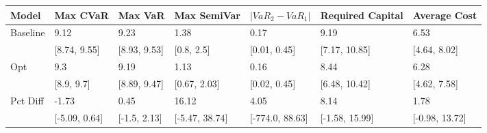 \begin{tabular}{lllllll}
\toprule
   Model &      Max CVaR &      Max VaR &    Max SemiVar & $|VaR_2 - VaR_1|$ & Required Capital &   Average Cost \\
\midrule
Baseline &          9.12 &         9.23 &           1.38 &              0.17 &             9.19 &           6.53 \\
         &  [8.74, 9.55] & [8.93, 9.53] &     [0.8, 2.5] &      [0.01, 0.45] &    [7.17, 10.85] &   [4.64, 8.02] \\
     Opt &           9.3 &         9.19 &           1.13 &              0.16 &             8.44 &           6.28 \\
         &    [8.9, 9.7] & [8.89, 9.47] &   [0.67, 2.03] &      [0.02, 0.45] &    [6.48, 10.42] &   [4.62, 7.58] \\
Pct Diff &         -1.73 &         0.45 &          16.12 &              4.05 &             8.14 &           1.78 \\
         & [-5.09, 0.64] & [-1.5, 2.13] & [-5.47, 38.74] &   [-774.0, 88.63] &   [-1.58, 15.99] & [-0.98, 13.72] \\
\bottomrule
\end{tabular}
